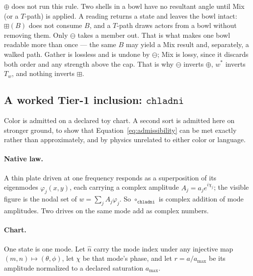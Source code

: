 \documentclass[12pt, a4paper]{article}
\begin{document}
$\oplus$ does not run this rule. Two shells in a bowl have no
resultant angle until Mix (or a $T$-path) is applied.
A reading returns a state and leaves the bowl intact: $\boxplus(B)$
does not consume $B$, and a $T$-path draws actors from a bowl without
removing them. Only $\ominus$ takes a member out. That is what makes
one bowl readable more than once --- the same $B$ may yield a Mix
result and, separately, a walked path.
Gather is lossless and is undone by $\ominus$; Mix is lossy, since it
discards both order and any strength above the cap. That is why
$\ominus$ inverts $\oplus$, $w^{*}$ inverts $T_w$, and nothing inverts
$\boxplus$.

\subsection{A worked Tier-1 inclusion: \texorpdfstring{$\mathtt{chladni}$}{chladni}}
\label{subsec:chladni_inclusion}
Color is admitted on a declared toy chart. A second sort is admitted
here on stronger ground, to show that
Equation~\eqref{eq:admissibility} can be met exactly rather than
approximately, and by physics unrelated to either color or language.

\paragraph{Native law.}
A thin plate driven at one frequency responds as a superposition of
its eigenmodes $\varphi_j(x,y)$, each carrying a complex amplitude
$A_j=a_j e^{i\chi_j}$; the visible figure is the nodal set of
$w=\sum_j A_j\varphi_j$. So $\circ_{\mathtt{chladni}}$ is complex
addition of mode amplitudes. Two drives on the same mode add as
complex numbers.

\paragraph{Chart.}
One state is one mode. Let $\hat n$ carry the mode index under any
injective map $(m,n)\mapsto(\theta,\phi)$, let $\chi$ be that mode's
phase, and let $r=a/a_{\max}$ be its amplitude normalized to a
declared saturation $a_{\max}$.
\end{document}
